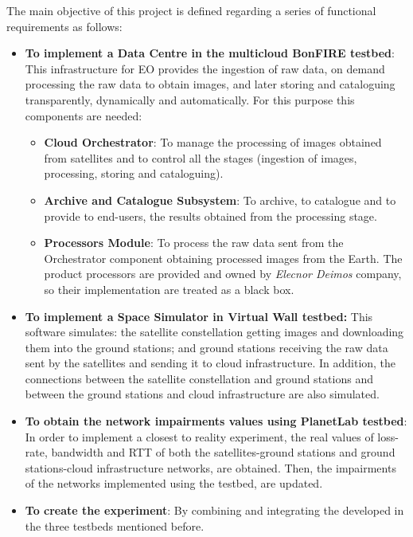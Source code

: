 The main objective of this project is defined regarding a series of functional
requirements as follows:
\begin{itemize}

\item {\textbf{To implement a Data Centre in the multicloud BonFIRE testbed}: This
  infrastructure for \ac{EO} provides the ingestion of raw data, on demand processing the raw
  data to obtain images, and later storing and cataloguing transparently,
  dynamically and automatically. For this purpose this components are needed:
}
\begin{itemize}

\item{\textbf{Cloud Orchestrator}: To manage the
  processing of images obtained from satellites and to control all the stages
  (ingestion of images, processing, storing and cataloguing).}
\item {\textbf{Archive and Catalogue Subsystem}: To archive, to catalogue and to
    provide to end-users, 
 the results obtained from the processing stage.}
\item{\textbf{Processors Module}: To process the raw data sent from
  the Orchestrator component obtaining processed images from the Earth. The product
  processors are provided and owned by \emph{Elecnor Deimos} company, so their implementation are treated as a black box.}
\end{itemize}

\item \textbf{To implement a Space Simulator in Virtual Wall testbed:} This
  software simulates: the satellite
  constellation getting images and downloading them into the ground stations; and ground
  stations receiving the raw data sent by the satellites and sending it to cloud
  infrastructure. In addition, the connections
  between the satellite constellation and ground stations and between the ground
  stations and cloud infrastructure are also simulated. 

\item {\textbf{To obtain the network impairments values using PlanetLab testbed}: In
    order to implement a closest to reality experiment, the real values of
    loss-rate, bandwidth and \ac{RTT} of both the satellites-ground stations and
    ground stations-cloud infrastructure networks, are obtained. Then, the
    impairments of the networks implemented using the \vw testbed, are updated.}

\item {\textbf{To create the experiment}: By combining and integrating
  the developed in the three testbeds mentioned before.}


\end{itemize}
